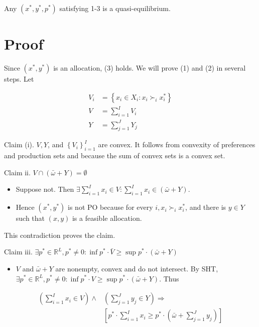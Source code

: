 \documentclass[10pt]{article}
\begin{document}
Any $\left(x^{*}, y^{*}, p^{*}\right)$ satisfying 1-3 is a quasi-equilibrium.

\section*{Proof}
Since $\left(x^{*}, y^{*}\right)$ is an allocation, (3) holds. We will prove (1) and (2) in several steps. Let

$$
\begin{aligned}
V_{i} & =\left\{x_{i} \in X_{i}: x_{i} \succ_{i} x_{i}^{*}\right\} \\
V & =\sum_{i=1}^{I} V_{i} \\
Y & =\sum_{j=1}^{J} Y_{j}
\end{aligned}
$$

Claim (i). $V, Y$, and $\left\{V_{i}\right\}_{i=1}^{I}$ are convex. It follows from convexity of preferences and production sets and because the sum of convex sets is a convex set.

Claim ii. $V \cap(\bar{\omega}+Y)=\emptyset$

\begin{itemize}
  \item Suppose not. Then $\exists \sum_{i=1}^{I} x_{i} \in V: \sum_{i=1}^{I} x_{i} \in(\bar{\omega}+Y)$.
  \item Hence $\left(x^{*}, y^{*}\right)$ is not PO because for every $i, x_{i} \succ_{i} x_{i}^{*}$, and there is $y \in Y$ such that $(x, y)$ is a feasible allocation.
\end{itemize}

This contradiction proves the claim.

Claim iii. $\exists p^{*} \in \mathbb{R}^{L}, p^{*} \neq 0: \inf p^{*} \cdot \bar{V} \geq \sup p^{*} \cdot(\bar{\omega}+Y)$

\begin{itemize}
  \item $V$ and $\bar{\omega}+Y$ are nonempty, convex and do not intersect. By SHT,\\
$\exists p^{*} \in \mathbb{R}^{L}, p^{*} \neq 0: \inf p^{*} \cdot V \geq \sup p^{*} \cdot(\bar{\omega}+Y)$. Thus
\end{itemize}

$$
\begin{aligned}
\left(\sum_{i=1}^{I} x_{i} \in V\right) \wedge & \left(\sum_{j=1}^{J} y_{j} \in Y\right) \Longrightarrow \\
& {\left[p^{*} \cdot \sum_{i=1}^{I} x_{i} \geq p^{*} \cdot\left(\bar{\omega}+\sum_{j=1}^{J} y_{j}\right)\right] }
\end{aligned}
$$
\end{document}
